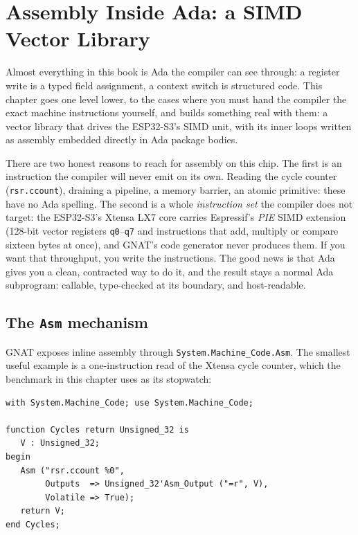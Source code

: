 \chapter{Assembly Inside Ada: a SIMD Vector Library}
\label{ch:asm}

Almost everything in this book is Ada the compiler can see through: a register
write is a typed field assignment, a context switch is structured code. This
chapter goes one level lower, to the cases where you must hand the compiler the
exact machine instructions yourself, and builds something real with them: a
vector library that drives the ESP32-S3's SIMD unit, with its inner loops written
as assembly embedded directly in Ada package bodies.

There are two honest reasons to reach for assembly on this chip. The first is an
instruction the compiler will never emit on its own. Reading the cycle counter
(\texttt{rsr.ccount}), draining a pipeline, a memory barrier, an atomic primitive:
these have no Ada spelling. The second is a whole \emph{instruction set} the
compiler does not target: the ESP32-S3's Xtensa LX7 core carries Espressif's
\emph{PIE} SIMD extension (128-bit vector registers \texttt{q0}--\texttt{q7} and
instructions that add, multiply or compare sixteen bytes at once), and GNAT's code
generator never produces them. If you want that throughput, you write the
instructions. The good news is that Ada gives you a clean, contracted way to do it,
and the result stays a normal Ada subprogram: callable, type-checked at its
boundary, and host-readable.

\section{The \texttt{Asm} mechanism}

GNAT exposes inline assembly through \texttt{System.Machine\_Code.Asm}. The
smallest useful example is a one-instruction read of the Xtensa cycle counter,
which the benchmark in this chapter uses as its stopwatch:

\begin{lstlisting}
with System.Machine_Code; use System.Machine_Code;

function Cycles return Unsigned_32 is
   V : Unsigned_32;
begin
   Asm ("rsr.ccount %0",
        Outputs  => Unsigned_32'Asm_Output ("=r", V),
        Volatile => True);
   return V;
end Cycles;
\end{lstlisting}

